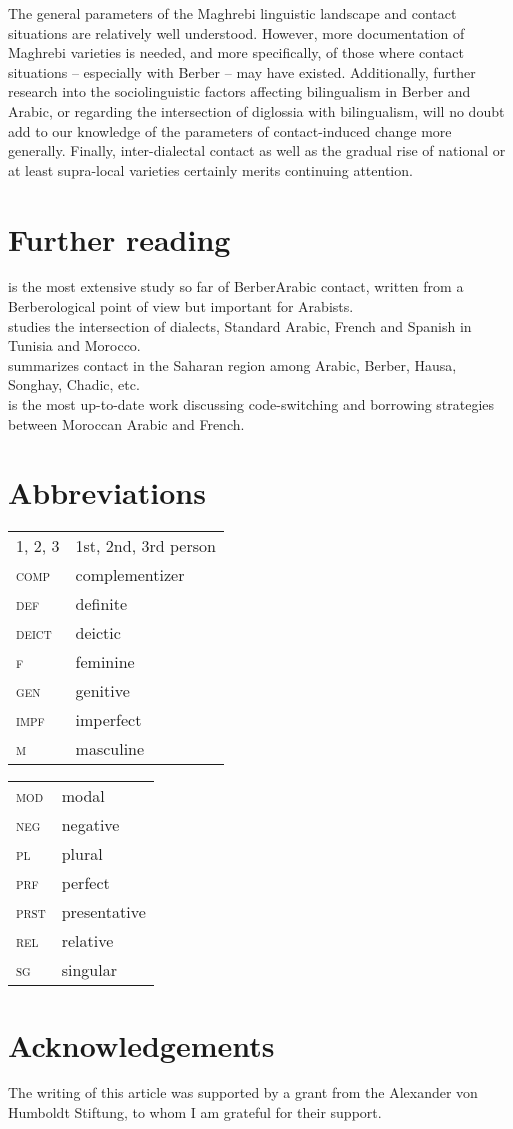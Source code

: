 \documentclass[output=paper]{langsci/langscibook}
\begin{document}
The general parameters of the Maghrebi linguistic landscape and contact situations are relatively well understood. However, more documentation of Maghrebi varieties is needed, and more specifically, of those where contact situations -- especially with Berber -- may have existed. Additionally, further research into the sociolinguistic factors affecting bilingualism in Berber and Arabic, or regarding the intersection of diglossia with bilingualism, will no doubt add to our knowledge of the parameters of contact-induced change more generally. Finally, inter-dialectal contact as well as the gradual rise of national or at least supra-local varieties certainly merits continuing attention.

\section*{Further reading}

\citet{Kossmann2013book} is the most extensive study so far of Berber\textendash Arabic contact, written from a Berberological point of view but important for Arabists.\\
\citet{Sayahi2014} studies the intersection of dialects, Standard Arabic, French and Spanish in Tunisia and Morocco.\\
\citet{Souag2016sahara} summarizes contact in the Saharan region among Arabic, Berber, Hausa, Songhay, Chadic, etc.\\
\citet{Ziamari2008} is the most up-to-date work discussing code-switching and borrowing strategies between Moroccan Arabic and French.
 

\section*{Abbreviations}

\begin{tabularx}{.45\textwidth}{lQ}
\textsc{1, 2, 3} & 1st, 2nd, 3rd person \\
\textsc{comp} & complementizer \\
\textsc{def} & definite \\
\textsc{deict} & deictic \\
\textsc{f} & feminine \\
\textsc{gen} & genitive \\
\textsc{impf} & imperfect \\
\textsc{m} & masculine \\
\end{tabularx}
\begin{tabularx}{.45\textwidth}{lQ}
\textsc{mod} & modal \\
\textsc{neg} & negative \\
\textsc{pl} & plural \\
\textsc{prf} & perfect \\
\textsc{prst} & presentative \\
\textsc{rel} & relative \\
\textsc{sg} & singular \\
\end{tabularx}


\section*{Acknowledgements} 
The writing of this article was supported by a grant from the Alexander von Humboldt Stiftung, to whom I am grateful for their support.

\sloppy
\printbibliography[heading=subbibliography,notkeyword=this] 
\end{document}
